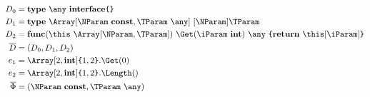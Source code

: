 \begin{align*}
    D_0       & = \type~\any~\interface\br{}                                                                       \\
    D_1       & = \type~\Array[\NParam~\const, \TParam~\any]~[\NParam]\TParam                                      \\
    D_2       & = \func (\this~\Array[\NParam, \TParam])~\Get(\iParam~\kw{int})~\any~\br{ \return~\this[\iParam] } \\
    \ov{D}    & = (D_0, D_1, D_2)                                                                                  \\
    e_1       & = \Array[2, \kw{int}]\br{1, 2}.\Get(0)                                                             \\
    e_2       & = \Array[2, \kw{int}]\br{1, 2}.\Length()                                                           \\
    \ov{\Phi} & = (\NParam~\const,\TParam~\any)
\end{align*}


